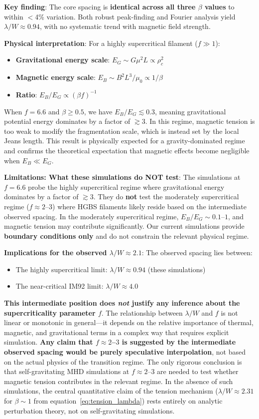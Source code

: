 \documentclass[11pt,a4paper]{article}
\begin{document}
\textbf{Key finding}: The core spacing is \textbf{identical across all three $\beta$ values} to within $<$4\% variation. Both robust peak-finding and Fourier analysis yield $\lambda/W \approx 0.94$, with no systematic trend with magnetic field strength.

\textbf{Physical interpretation}: For a highly supercritical filament ($f \gg 1$):
\begin{itemize}
    \item \textbf{Gravitational energy scale}: $E_G \sim G \mu^2 L \propto \rho_c^2$
    \item \textbf{Magnetic energy scale}: $E_B \sim B^2 L^3 / \mu_0 \propto 1/\beta$
    \item \textbf{Ratio}: $E_B / E_G \propto (\beta f)^{-1}$
\end{itemize}
When $f = 6.6$ and $\beta \geq 0.5$, we have $E_B / E_G \lesssim 0.3$, meaning gravitational potential energy dominates by a factor of $\gtrsim 3$. In this regime, magnetic tension is too weak to modify the fragmentation scale, which is instead set by the local Jeans length. This result is physically expected for a gravity-dominated regime and confirms the theoretical expectation that magnetic effects become negligible when $E_B \ll E_G$.

\textbf{Limitations: What these simulations do NOT test}: The simulations at $f = 6.6$ probe the highly supercritical regime where gravitational energy dominates by a factor of $\gtrsim 3$. They do \textbf{not} test the moderately supercritical regime ($f \approx 2$--$3$) where HGBS filaments likely reside based on the intermediate observed spacing. In the moderately supercritical regime, $E_B / E_G \sim 0.1$--$1$, and magnetic tension may contribute significantly. Our current simulations provide \textbf{boundary conditions only} and do not constrain the relevant physical regime.

\textbf{Implications for the observed $\lambda/W \approx 2.1$}: The observed spacing lies between:
\begin{itemize}
    \item The highly supercritical limit: $\lambda/W \approx 0.94$ (these simulations)
    \item The near-critical IM92 limit: $\lambda/W \approx 4.0$
\end{itemize}
\textbf{This intermediate position does \textit{not} justify any inference about the supercriticality parameter $f$}. The relationship between $\lambda/W$ and $f$ is not linear or monotonic in general—it depends on the relative importance of thermal, magnetic, and gravitational terms in a complex way that requires explicit simulation. \textbf{Any claim that $f \approx 2$--$3$ is suggested by the intermediate observed spacing would be purely speculative interpolation}, not based on the actual physics of the transition regime. The only rigorous conclusion is that self-gravitating MHD simulations at $f \approx 2$--$3$ are needed to test whether magnetic tension contributes in the relevant regime. In the absence of such simulations, the central quantitative claim of the tension mechanism ($\lambda/W \approx 2.31$ for $\beta \sim 1$ from equation~\ref{eq:tension_lambda}) rests entirely on analytic perturbation theory, not on self-gravitating simulations.
\end{document}
